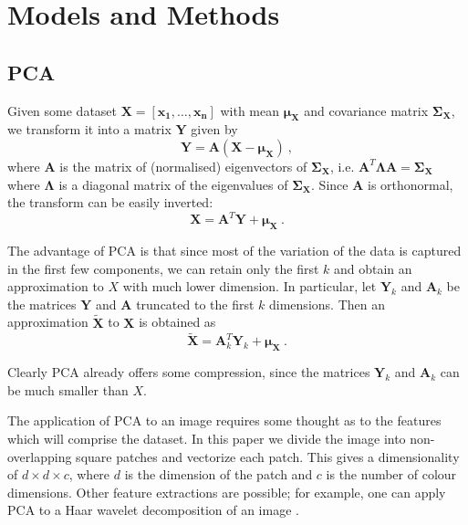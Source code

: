 \section{Models and Methods}
\label{models}
\subsection{PCA}
Given some dataset $\mathbf{X} = [\mathbf{x_1}, \ldots, \mathbf{x_n}]$ with mean $\mathbf{\mu_X}$ and covariance matrix $\mathbf{\Sigma_X}$, we transform it into a matrix $\mathbf{Y}$ given by
\begin{equation*}
	\mathbf{Y} = \mathbf{A} (\mathbf{X} - \mathbf{\mu_X}) ~ ,
\end{equation*}
where $\mathbf{A}$ is the matrix of (normalised) eigenvectors of $\mathbf{\Sigma_X}$, i.e. $\mathbf{A}^T \mathbf{\Lambda} \mathbf{A} = \mathbf{\Sigma_X}$ where $\mathbf{\Lambda}$ is a diagonal matrix of the eigenvalues of $\mathbf{\Sigma_X}$. Since $\mathbf{A}$ is orthonormal, the transform can be easily inverted:
\begin{equation*}
	\mathbf{X} = \mathbf{A}^T \mathbf{Y} + \mathbf{\mu_X} ~ .
\end{equation*}

The advantage of PCA is that since most of the variation of the data is captured in the first few components, we can retain only the first $k$ and obtain an approximation to $X$ with much lower dimension. In particular, let $\mathbf{Y}_k$ and $\mathbf{A}_k$ be the matrices $\mathbf{Y}$ and $\mathbf{A}$ truncated to the first $k$ dimensions. Then an approximation $\mathbf{\tilde X}$ to $\mathbf{X}$ is obtained as
\begin{equation*}
	\mathbf{\tilde X} = \mathbf{A}_k^T \mathbf{Y}_k + \mathbf{\mu_X} ~ .
\end{equation*}

Clearly PCA already offers some compression, since the matrices $\mathbf{Y}_k$ and $\mathbf{A}_k$ can be much smaller than $X$.

The application of PCA to an image requires some thought as to the features which will comprise the dataset. In this paper we divide the image into non-overlapping square patches and vectorize each patch. This gives a dimensionality of $d \times d \times c$, where $d$ is the dimension of the patch and $c$ is the number of colour dimensions. Other feature extractions are possible; for example, one can apply PCA to a Haar wavelet decomposition of an image \cite{tong2010wavelet}.

